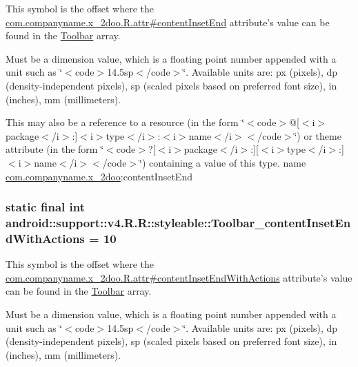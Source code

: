 This symbol is the offset where the \hyperlink{classcom_1_1companyname_1_1x__2doo_1_1_r_1_1attr_58c86668d5cc32508a8afdee1e07a9d8}{com.companyname.x\_\-2doo.R.attr\#contentInsetEnd} attribute's value can be found in the \hyperlink{classandroid_1_1support_1_1v4_1_1_r_1_1styleable_0646d71cfbd4a8645c7d805b33e1c574}{Toolbar} array.

Must be a dimension value, which is a floating point number appended with a unit such as \char`\"{}$<$code$>$14.5sp$<$/code$>$\char`\"{}. Available units are: px (pixels), dp (density-independent pixels), sp (scaled pixels based on preferred font size), in (inches), mm (millimeters). 

This may also be a reference to a resource (in the form \char`\"{}$<$code$>$@\mbox{[}$<$i$>$package$<$/i$>$:\mbox{]}$<$i$>$type$<$/i$>$:$<$i$>$name$<$/i$>$$<$/code$>$\char`\"{}) or theme attribute (in the form \char`\"{}$<$code$>$?\mbox{[}$<$i$>$package$<$/i$>$:\mbox{]}\mbox{[}$<$i$>$type$<$/i$>$:\mbox{]}$<$i$>$name$<$/i$>$$<$/code$>$\char`\"{}) containing a value of this type.  name \hyperlink{namespacecom_1_1companyname_1_1x__2doo}{com.companyname.x\_\-2doo}:contentInsetEnd \hypertarget{classandroid_1_1support_1_1v4_1_1_r_1_1styleable_40116b816489b853ec057c9c36ebe7c1}{
\subsubsection[{Toolbar\_\-contentInsetEndWithActions}]{\setlength{\rightskip}{0pt plus 5cm}static final int android::support::v4.R.R::styleable::Toolbar\_\-contentInsetEndWithActions = 10}}
\label{classandroid_1_1support_1_1v4_1_1_r_1_1styleable_40116b816489b853ec057c9c36ebe7c1}


This symbol is the offset where the \hyperlink{classcom_1_1companyname_1_1x__2doo_1_1_r_1_1attr_af3871d51ee2abdd46db1ee09223225a}{com.companyname.x\_\-2doo.R.attr\#contentInsetEndWithActions} attribute's value can be found in the \hyperlink{classandroid_1_1support_1_1v4_1_1_r_1_1styleable_0646d71cfbd4a8645c7d805b33e1c574}{Toolbar} array.

Must be a dimension value, which is a floating point number appended with a unit such as \char`\"{}$<$code$>$14.5sp$<$/code$>$\char`\"{}. Available units are: px (pixels), dp (density-independent pixels), sp (scaled pixels based on preferred font size), in (inches), mm (millimeters). 

